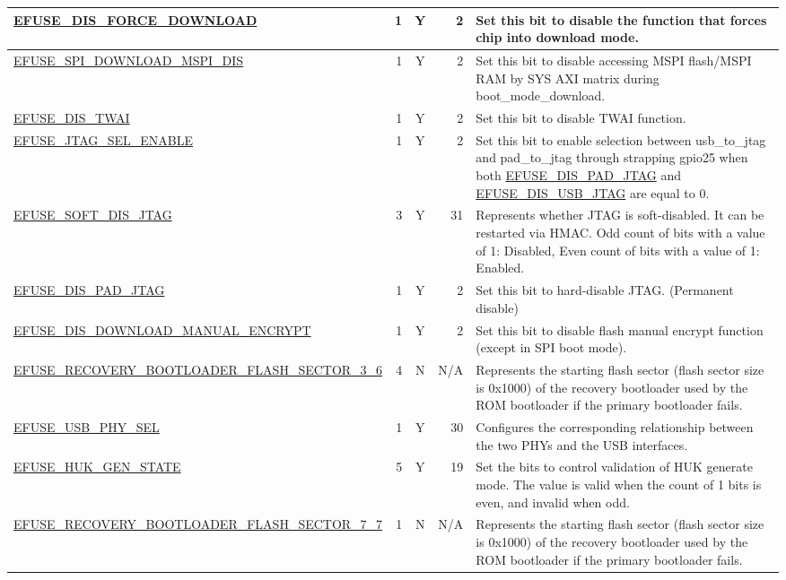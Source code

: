 \begin{longtable}[l]{ |m{8.2cm}|r|c|r|m{9cm}| }
    \hyperref[fielddesc:EFUSEDISFORCEDOWNLOAD]{EFUSE\_DIS\_FORCE\_DOWNLOAD} & 1 & Y & 2 & Set this bit to disable the function that forces chip into download mode. \\ \hline
    \hyperref[fielddesc:EFUSESPIDOWNLOADMSPIDIS]{EFUSE\_SPI\_DOWNLOAD\_MSPI\_DIS} & 1 & Y & 2 & Set this bit to disable accessing MSPI flash/MSPI RAM by SYS AXI matrix during boot\_mode\_download. \\ \hline
    \hyperref[fielddesc:EFUSEDISTWAI]{EFUSE\_DIS\_TWAI} & 1 & Y & 2 & Set this bit to disable TWAI function. \\ \hline
    \hyperref[fielddesc:EFUSEJTAGSELENABLE]{EFUSE\_JTAG\_SEL\_ENABLE} & 1 & Y & 2 & Set this bit to enable selection between usb\_to\_jtag and pad\_to\_jtag through strapping gpio25 when both \hyperref[fielddesc:EFUSEDISPADJTAG]{EFUSE\_DIS\_PAD\_JTAG} and \hyperref[fielddesc:EFUSEDISUSBJTAG]{EFUSE\_DIS\_USB\_JTAG} are equal to 0. \\ \hline
    \hyperref[fielddesc:EFUSESOFTDISJTAG]{EFUSE\_SOFT\_DIS\_JTAG} & 3 & Y & 31 & Represents whether JTAG is soft-disabled. It can be restarted via HMAC. Odd count of bits with a value of 1: Disabled, Even count of bits with a value of 1: Enabled. \\ \hline
    \hyperref[fielddesc:EFUSEDISPADJTAG]{EFUSE\_DIS\_PAD\_JTAG} & 1 & Y & 2 & Set this bit to hard-disable JTAG. (Permanent disable) \\ \hline
    \hyperref[fielddesc:EFUSEDISDOWNLOADMANUALENCRYPT]{EFUSE\_DIS\_DOWNLOAD\_MANUAL\_ENCRYPT} & 1 & Y & 2 & Set this bit to disable flash manual encrypt function (except in SPI boot mode). \\ \hline
    \hyperref[fielddesc:EFUSERECOVERYBOOTLOADERFLASHSECTOR36]{EFUSE\_RECOVERY\_BOOTLOADER\_FLASH\_\-SECTOR\_3\_6} & 4 & N & N/A & Represents the starting flash sector (flash sector size is 0x1000) of the recovery bootloader used by the ROM bootloader if the primary bootloader fails.\\ \hline
    \hyperref[fielddesc:EFUSEUSBPHYSEL]{EFUSE\_USB\_PHY\_SEL} & 1 & Y & 30 &  Configures the corresponding relationship between the two PHYs and the USB interfaces.\\ \hline
    \hyperref[fielddesc:EFUSEHUKGENSTATE]{EFUSE\_HUK\_GEN\_STATE} & 5 & Y & 19 & Set the bits to control validation of HUK generate mode. The value is valid when the count of 1 bits is even, and invalid when odd. \\ \hline
    \hyperref[fielddesc:EFUSERECOVERYBOOTLOADERFLASHSECTOR77]{EFUSE\_RECOVERY\_BOOTLOADER\_FLASH\_\-SECTOR\_7\_7} & 1 & N & N/A & Represents the starting flash sector (flash sector size is 0x1000) of the recovery bootloader used by the ROM bootloader if the primary bootloader fails.  \\ \hline

\end{longtable}
